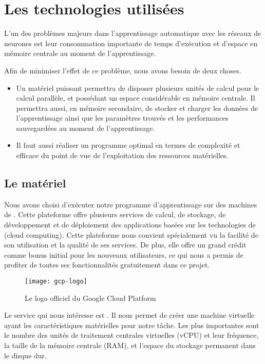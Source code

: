 \section{Les technologies utilisées}

L'un des problèmes majeurs dans l'apprentissage automatique avec les réseaux
de neurones est leur consommation importante de temps d'exécution et d'espace
en mémoire centrale au moment de l'apprentissage.

Afin de minimiser l'effet de ce problème, nous avons besoin de deux choses.

\begin{itemize}
  \item Un matériel puissant permettra de disposer plusieurs unités de calcul
  pour le calcul parallèle, et possédant un espace considérable en mémoire
  centrale. Il permettra aussi, en mémoire secondaire, de stocker et charger les
  données de l'apprentissage ainsi que les paramètres trouvés et les performances
  sauvegardées au moment de l'apprentissage.
  \item Il faut aussi réaliser un programme optimal en termes de complexité et efficace du
  point de vue de l'exploitation des ressources matérielles.
\end{itemize}

\subsection{Le matériel}

Nous avons choisi d'exécuter notre programme d'apprentissage sur des machines de
. Cette plateforme offre plusieurs services de calcul, de stockage,
de développement et de déploiement des applications basées sur les technologies
de  (cloud computing). Cette plateforme nous convient spécialement vu la facilité
de son utilisation et la qualité de ses services. De plus, elle offre un grand crédit
comme bonus initial pour les nouveaux utilisateurs, ce qui nous a permis de profiter de toutes ses
fonctionnalités gratuitement dans ce projet.

\begin{figure}[h]
  \centering
  \texttt{[image: gcp-logo]}
  \caption[Le logo officiel du Google Cloud Platform]{Le logo officiel du Google Cloud Platform \cite{gcp}}
\end{figure}

Le service qui nous intéresse est . Il nous permet de
créer une machine virtuelle ayant les caractéristiques matérielles pour notre tâche.
Les plus importantes sont le nombre des unités de traitement
centrales virtuelles (vCPU) et leur fréquence, la taille de la mémoire centrale
(RAM), et l'espace du stockage permanent dans le disque dur.

